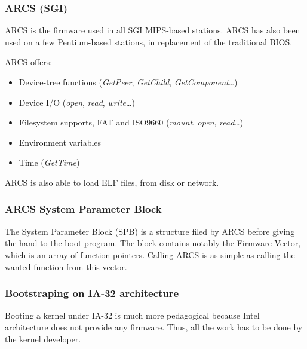 \begin{frame}
  \frametitle{ARCS (SGI)}

  ARCS is the firmware used in all SGI MIPS-based stations. ARCS has
  also been used on a few Pentium-based stations, in replacement of
  the traditional BIOS.

  \-

  ARCS offers:

  \begin{itemize}
  \item
    Device-tree functions (\emph{GetPeer}, \emph{GetChild},
    \emph{GetComponent}\ldots)
  \item
    Device I/O (\emph{open}, \emph{read}, \emph{write}\ldots)
  \item
    Filesystem supports, FAT and ISO9660 (\emph{mount}, \emph{open},
    \emph{read}\ldots)
  \item
    Environment variables
  \item
    Time (\emph{GetTime})
  \end{itemize}

  \-

  ARCS is also able to load ELF files, from disk or network.

\end{frame}


\begin{frame}
  \frametitle{ARCS System Parameter Block}

  The System Parameter Block (SPB) is a structure filed by ARCS before
  giving the hand to the boot program. The block contains notably the
  Firmware Vector, which is an array of function pointers. Calling
  ARCS is as simple as calling the wanted function from this vector.

\end{frame}


\begin{frame}
  \frametitle{Bootstraping on IA-32 architecture}

  Booting a kernel under IA-32 is much more pedagogical because Intel architecture does not provide any firmware. Thus, all the work has to be done by the kernel developer.

\end{frame}

%
%
%

